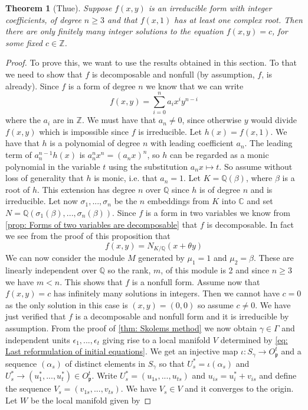 \documentclass{article}
\newtheorem{theorem}{Theorem}[section]
\newcommand{\mfrak}[1]{\mathfrak{#1}}
\newcommand{\mbb}[1]{\mathbb{#1}}
\begin{document}

\begin{theorem}[Thue]\label{thm: Thues theorem}
    Suppose $f(x,y)$ is an irreducible form with integer coefficients, of degree $n \geq 3$ and that $f(x,1)$ has at least one complex root. Then there are only finitely many integer solutions to the equation $f(x,y) = c$, for some fixed $c \in \mbb{Z}$.
\end{theorem}
\begin{proof}
    To prove this, we want to use the results obtained in this section. To that we need to show that $f$ is decomposable and nonfull (by assumption, $f$, is already). Since $f$ is a form of degree $n$ we know that we can write
    $$f(x,y) = \sum_{i = 0}^n a_i x^{i} y^{n-i}$$
    where the $a_i$ are in $\mbb Z$. We must have that $a_n \neq 0$, since otherwise $y$ would divide $f(x,y)$ which is impossible since $f$ is irreducible. Let $h(x) = f(x,1)$. We have that $h$ is a polynomial of degree $n$ with leading coefficient $a_n$. The leading term of $a_n^{n-1} h(x)$ is $a_n^nx^n = (a_n x)^n$, so $h$ can be regarded as a monic polynomial in the variable $t$ using the substitution $a_n x \mapsto t$. So assume without loss of generality that $h$ is monic, i.e. that $a_n = 1$. Let $K = \mbb Q(\beta)$, where $\beta$ is a root of $h$. This extension has degree $n$ over $\mbb Q$ since $h$ is of degree $n$ and is irreducible. Let now $\sigma_1, ..., \sigma_n$ be the $n$ embeddings from $K$ into $\mbb C$ and set $N = \mbb Q(\sigma_1(\beta), ..., \sigma_n(\beta))$. Since $f$ is a form in two variables we know from \cref{prop: Forms of two variables are decomposable} that $f$ is decomposable. In fact we see from the proof of this proposition that
    $$f(x, y) = N_{K / \mbb Q}(x + \theta y)$$
    We can now consider the module $M$ generated by $\mu_1 = 1$ and $\mu_2 = \beta$. These are linearly independent over $\mbb Q$ so the rank, $m$, of this module is 2 and since $n \geq 3$ we have $m < n$. This shows that $f$ is a nonfull form. Assume now that $f(x,y) = c$ has infinitely many solutions in integers. Then we cannot have $c = 0$ as the only solution in this case is $(x,y) = (0,0)$ so assume $c \neq 0$. We have just verified that $f$ is a decomposable and nonfull form and it is irreducible by assumption. From the proof of \cref{thm: Skolems method} we now obtain $\gamma \in \Gamma$ and independent units $\epsilon_1, ..., \epsilon_t$ giving rise to a local manifold $V$ determined by \cref{eq: Last reformulation of initial equations}. We get an injective map $\iota : S_\gamma \to O_\mfrak p^t$ and a sequence $(\alpha_s)$ of distinct elements in $S_\gamma$ so that $U^*_s = \iota(\alpha_s)$ and $U^*_s \to (u_1^*, ..., u_t^*) \in O_\mfrak p^t$. Write $U^*_s = (u_{1s}, ..., u_{ts})$ and $u_{is} = u_i^* + v_{is}$ and define the sequence $V_s = (v_{1s}, ..., v_{ts})$. We have $V_s \in V$ and it converges to the origin. Let $W$ be the local manifold given by 

\end{proof}
\end{document}
